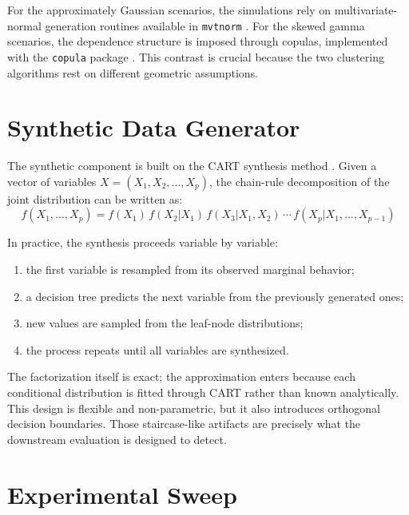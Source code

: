 For the approximately Gaussian scenarios, the simulations rely on multivariate-normal generation routines available in \texttt{mvtnorm} \cite{mvtnormmanual,genzbretz2009}. For the skewed gamma scenarios, the dependence structure is imposed through copulas, implemented with the \texttt{copula} package \cite{yan2007}. This contrast is crucial because the two clustering algorithms rest on different geometric assumptions.

\section{Synthetic Data Generator}
\label{sec:synthetic-data-generator}

The synthetic component is built on the CART synthesis method \cite{nowok2016}. Given a vector of variables $X = (X_1, X_2, ..., X_p)$, the chain-rule decomposition of the joint distribution can be written as:
\begin{equation}
  f(X_1, ..., X_p) = f(X_1)\, f(X_2|X_1)\, f(X_3|X_1, X_2)\, \cdots\, f(X_p|X_1, ..., X_{p-1})
\end{equation}

In practice, the synthesis proceeds variable by variable:
\begin{enumerate}
  \item the first variable is resampled from its observed marginal behavior;
  \item a decision tree predicts the next variable from the previously generated ones;
  \item new values are sampled from the leaf-node distributions;
  \item the process repeats until all variables are synthesized.
\end{enumerate}

The factorization itself is exact; the approximation enters because each conditional distribution is fitted through CART rather than known analytically. This design is flexible and non-parametric, but it also introduces orthogonal decision boundaries. Those staircase-like artifacts are precisely what the downstream evaluation is designed to detect.

\section{Experimental Sweep}
\label{sec:experimental-sweep}

